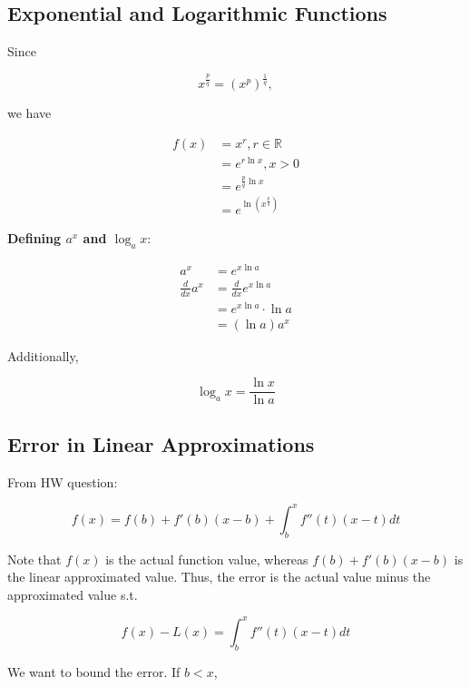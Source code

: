     \subsection{Exponential and Logarithmic Functions}

        Since

        \[
            x^{\frac{p}{q}} = \left(x^p\right)^{\frac{1}{q}},
        \]

        we have

        \begin{align*}
            f(x)    &= x^r, r\in \mathbb{R} \\
                    &= e^{r\ln{x}},x > 0 \\
                    &= e^{\frac{p}{q}\ln{x}} \\
                    &= e^{\ln{\left(x^{\frac{p}{q}}\right)}}
        \end{align*}

        \textbf{Defining $a^x$ and $\log_a {x}$}:

        \begin{align*}
            a^x &= e^{x\ln{a}} \\
            \frac{d}{dx}a^x &= \frac{d}{dx}e^{x\ln{a}} \\
                            &= e^{x\ln{a}}\cdot\ln{a} \\
                            &= (\ln{a})a^x
        \end{align*}

        Additionally,

        \[
            \log_a {x} = \frac{\ln{x}}{\ln{a}}
        \]





    \subsection{Error in Linear Approximations}

        From HW question:

        \[
            f(x) = f(b) + f'(b)(x-b) + \int_b^x f''(t)(x-t)dt
        \]

        Note that $f(x)$ is the actual function value, whereas $f(b)+f'(b)(x-b)$ is the linear approximated value. Thus, the error is the actual value minus the approximated value s.t.

        \[
            f(x) - L(x) = \int_b^x f''(t)(x-t)dt
        \]

        We want to bound the error. If $b < x$,


